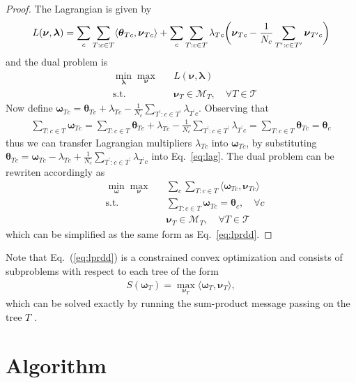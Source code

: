 \documentclass[conference]{IEEEtran}
\newcommand{\mM}{\mathcal{M}}
\newcommand{\mT}{\mathcal{T}}
\newcommand{\mth}{\mathbf{\boldsymbol \theta}}
\newcommand{\mnu}{\mathbf{\boldsymbol \nu}}
\newcommand{\mom}{\mathbf{\boldsymbol \omega}}
\newcommand{\la}{\langle}
\newcommand{\ra}{\rangle}
\newcommand{\cinT}{T : c \in T}
\newcommand{\cinTp}{T^\prime : c \in T^\prime}
\begin{document}
\begin{proof}
The Lagrangian is given by
\begin{align}
	L(\mnu, \boldsymbol \lambda) = \sum_c \sum_{\cinT} \la \mth_{Tc}, \mnu_{Tc} \ra + \sum_c \sum_{\cinT} \lambda_{Tc} \bigg{(}  \mnu_{Tc} - \frac{1}{N_c} \sum_{\cinTp} \mnu_{T^\prime c} \bigg{)}
	\label{eq:lag}
\end{align}
and the dual problem is 
\begin{equation}
\begin{aligned}
	&\min_{\boldsymbol \lambda} \max_{\mnu} && L(\mnu, \boldsymbol \lambda) \\
	&\textrm{s.t.} && \mnu_T \in \mM_T, \quad \forall T \in \mT
\end{aligned}
\end{equation}
Now define $\mom_{Tc} = \mth_{Tc} + \lambda_{Tc} - \frac{1}{N_c} \sum_{\cinTp} \lambda_{T^\prime c}$. Observing that
\begin{align}
	\sum_{\cinT} \mom_{Tc} = \sum_{\cinT} \mth_{Tc} + \lambda_{Tc} - \frac{1}{N_c} \sum_{\cinTp} \lambda_{T^\prime c} = \sum_{\cinT} \mth_{Tc} = \mth_c
\end{align}
thus we can transfer Lagrangian multipliers $\lambda_{Tc}$ into $\mom_{Tc}$, by substituting $\mth_{Tc} = \mom_{Tc} - \lambda_{Tc} + \frac{1}{N_c} \sum_{\cinTp} \lambda_{T^\prime c}$ into Eq.~\ref{eq:lag}. The dual problem can be rewriten accordingly as 
\begin{equation}
\begin{aligned}
	&\min_{\mom} \max_{\mnu} && \sum_c \sum_{\cinT} \la \mom_{Tc}, \mnu_{Tc} \ra \\
	&\textrm{s.t.} && \sum_{\cinT} \mom_{Tc} = \mth_c, \quad \forall c \\
	&&& \mnu_T \in \mM_T, \quad \forall T \in \mT
\end{aligned}
\end{equation}
which can be simplified as the same form as Eq.~\ref{eq:lprdd}.
\end{proof}

Note that Eq.~(\ref{eq:lprdd}) is a constrained convex optimization and consists of subproblems with respect to each tree of the form 
\begin{align}
	S(\mom_T) = \max_{\mnu_T} \la \mom_T, \mnu_T \ra,
\end{align}
which can be solved exactly by running the sum-product message passing on the tree $T$ \cite{Yanover06}.

\section{Algorithm}
\end{document}
